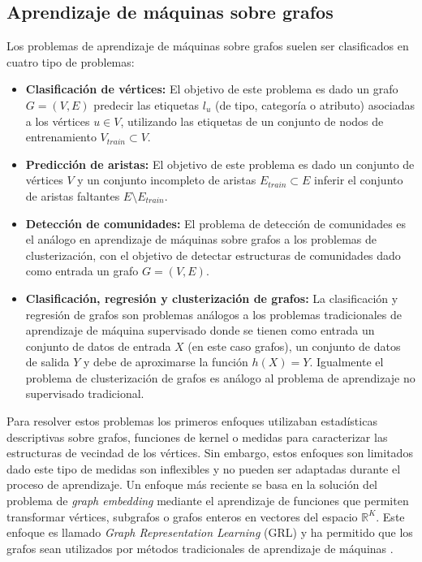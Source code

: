 \subsection{Aprendizaje de m\'aquinas sobre grafos}
Los problemas de aprendizaje de m\'aquinas sobre grafos suelen ser 
clasificados en cuatro tipo de problemas:

\begin{itemize}
    \item \textbf{Clasificaci\'on de v\'ertices: } El objetivo de este problema es dado un grafo $G = (V,E)$
    predecir las etiquetas $l_u$ (de tipo, categor\'ia o atributo) asociadas
    a los v\'ertices $u \in V$, utilizando las etiquetas de un conjunto de nodos de entrenamiento $V_{train} \subset V$.
    \item \textbf{Predicci\'on de aristas: } El objetivo de este problema es dado un conjunto de
    v\'ertices $V$ y un conjunto incompleto de aristas $E_{train} \subset E$ inferir el conjunto
    de aristas faltantes $ E \setminus E_{train}$.
    \item \textbf{Detecci\'on de comunidades: } El problema de detecci\'on de comunidades es el an\'alogo
    en aprendizaje de m\'aquinas sobre grafos a los problemas de clusterizaci\'on, con el objetivo de
    detectar estructuras de comunidades dado como entrada un grafo $G = (V,E)$.
    \item \textbf{Clasificaci\'on, regresi\'on y clusterizaci\'on de grafos: } La clasificaci\'on y regresi\'on de grafos son problemas
    an\'alogos a los problemas tradicionales de aprendizaje de m\'aquina supervisado donde se tienen como entrada un conjunto de
    datos de entrada $X$ (en este caso grafos), un conjunto de datos de salida $Y$ y debe de aproximarse la funci\'on $h(X) = Y$. Igualmente
    el problema de clusterizaci\'on de grafos es an\'alogo al problema de aprendizaje no supervisado tradicional. 
\end{itemize}

Para resolver estos problemas los primeros enfoques utilizaban estad\'isticas
descriptivas sobre grafos, funciones de kernel o medidas para caracterizar las
estructuras de vecindad de los v\'ertices. Sin embargo, estos enfoques son limitados
dado este tipo de medidas son inflexibles y no pueden ser adaptadas durante el proceso
de aprendizaje. Un enfoque m\'as reciente
se basa en la soluci\'on del problema de \textit{graph embedding} mediante el aprendizaje
de funciones que permiten transformar v\'ertices, subgrafos o grafos enteros en
vectores del espacio $\mathbb{R}^K$. Este enfoque es
llamado \textit{Graph Representation Learning} (GRL) y ha permitido que
los grafos sean utilizados por m\'etodos tradicionales de aprendizaje de m\'aquinas \cite{hamilton2017representation}.


